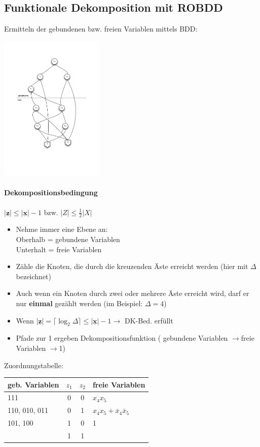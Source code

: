 \documentclass[6pt,a4paper]{scrartcl}
\renewcommand{\emph}[1]{\textsf{\textbf{#1}}}
\renewcommand{\vec}[1]{\ensuremath{\underline{\boldsymbol {#1}}}}
\newcommand{\abs}[1]{\ensuremath{\left\vert#1\right\vert}} 							%
\newcommand{\ol}[1]{\ensuremath{\overline{#1}}}									%
\newcommand{\ra}[0]{\ensuremath{\rightarrow}} 									%
\renewcommand{\vec}[1]{\ensuremath{\underline{\boldsymbol {#1}}}}
\begin{document}
\begin{multicols}{3}
\subsection{Funktionale Dekomposition mit ROBDD}
Ermitteln der gebundenen bzw. freien Variablen mittels BDD: \\
\parbox{2.7cm}{ \includegraphics[width = 5cm]{./img/eds/fdk.pdf} }
\paragraph{Dekompositionsbedingung} %
$\abs{\vec z} \le \abs{\vec x} - 1$ bzw. $\abs{Z} \le \frac{1}{2} \abs{X}$ \\
\begin{itemize}
	\item Nehme immer eine Ebene an:\\
	Oberhalb = gebundene Variablen \\ 
	Unterhalt = freie Variablen
	\item Zähle die Knoten, die durch die kreuzenden Äste erreicht werden (hier mit $\Delta$ bezeichnet)
	\item Auch wenn ein Knoten durch zwei oder mehrere Äste erreicht wird, darf er nur \emph{einmal} gezählt werden (im Beispiel: $\Delta = 4$)
	\item Wenn $\abs{\vec z} = \lceil \log_2 \Delta \rceil \le \abs{\vec{x}} - 1 \ra$ DK-Bed. erfüllt
	\item Pfade zur 1 ergeben Dekompositionsfunktion ( gebundene Variablen \ra freie Variablen \ra 1)
\end{itemize}
Zuordnungstabelle:\\
\begin{tabular}{l|cc|l}
geb. Variablen & $z_1$ & $z_2$ & freie Variablen \\ \midrule
111 & 0 & 0 & $x_4 x_5$ \\
110, 010, 011 & 0 & 1 & $x_4 x_5 + \ol x_4 \ol x_5$ \\
101, 100 & 1 & 0 & 1 \\
& 1&1& \\
\end{tabular}


\end{multicols}
\end{document}
